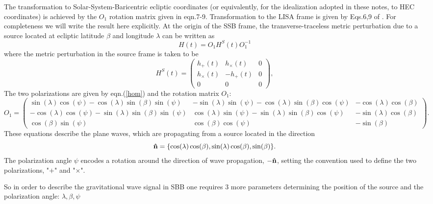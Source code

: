 \documentclass[11pt]{report}
\def\be{\begin{equation}}
\def\en{\end{equation}}
\begin{document}
The transformation to Solar-System-Baricentric ecliptic coordinates 
(or equivalently, for the idealization adopted in these notes, to HEC coordinates)
is achieved by the $O_1$ rotation matrix given in \cite{KTV} eqn.7-9.
Transformation to the LISA frame is given by Eqs.6,9 of \cite{KTV}.
For completeness we will write the result here explicitly. 
At the origin of the SSB frame, the transverse-traceless metric perturbation due 
to a source located at ecliptic latitude $\beta$ and longitude $\lambda$ can be written as
\be
H(t) = O_1 H^S(t)O_1^{-1}
\en
where the metric perturbation in the source frame is taken to be
\be
H^S(t) = \left( \begin{array}{ccc}
h_{+}(t) & h_{\times}(t) & 0 \\
h_{\times}(t) & -h_{+}(t) & 0 \\
0 & 0 & 0 \end{array} \right),
\en
The two polarizations are given by eqn.(\ref{hom}) and the rotation matrix
$O_1$:
\be
O_1 =\left( \begin{array}{ccc}
\sin(\lambda)\cos(\psi) - \cos(\lambda)\sin(\beta)\sin(\psi) &  
-\sin(\lambda)\sin(\psi) - \cos(\lambda)\sin(\beta)\cos(\psi) & 
-\cos(\lambda)\cos(\beta) \\  
-\cos(\lambda)\cos(\psi)  - \sin(\lambda)\sin(\beta)\sin(\psi) &
\cos(\lambda)\sin(\psi) - \sin(\lambda)\sin(\beta)\cos(\psi) &
 -\sin(\lambda)\cos(\beta) \\  
\cos(\beta)\sin(\psi) &  \cos(\beta)\cos(\psi) & -\sin(\beta)  
 \end{array} 
\right).
\en 
These equations describe the plane waves, which are
propagating from a source located in the direction
\be
{\bf \hat{n}} = \{ \cos(\lambda)\cos(\beta), \sin(\lambda)\cos(\beta), 
\sin(\beta)\}.
\en
The polarization angle $\psi$ encodes a rotation around the direction of wave propagation, $-{\bf \hat{n}}$, 
setting the convention used to define the two polarizations, "$+$" and "$\times$".

So in order to describe the gravitational wave signal in SBB  one requires 
3 more parameters determining the position of the source and the polarization angle: $\lambda, \beta, \psi$
 
\end{document}
